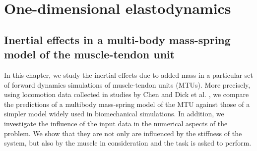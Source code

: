 \documentclass{sfuthesis}
\numberwithin{equation}{section}
\numberwithin{figure}{chapter}
\numberwithin{table}{chapter}
\theoremstyle{definition}
\begin{document}
\part{One-dimensional elastodynamics}

\chapter{Inertial effects in a multi-body mass-spring model of the muscle-tendon unit} \label{ch:mass_enhanced_model}






In this chapter, we study the inertial effects due to added mass in a particular set of forward dynamics simulations of muscle-tendon units (MTUs). More precisely, using locomotion data collected in studies by Chen \cite{EvanThesis} and Dick et al. \cite{Dick2016}, we compare the predictions of a multibody mass-spring model of the MTU against those of a simpler model widely used in biomechanical simulations. In addition, we investigate the influence of the input data in the numerical aspects of the problem. We show that they are not only are influenced by the stiffness of the system, but also by the muscle in consideration and the task is asked to perform.
\end{document}
